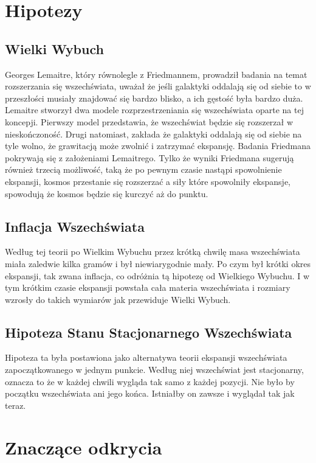 \documentclass[12pt]{article}
\begin{document}
	
	 
	\section{Hipotezy}
	\subsection{Wielki Wybuch}
	Georges Lemaitre, który równolegle z Friedmannem, prowadził badania na temat rozszerzania się wszechświata, uważał że jeśli galaktyki oddalają się od siebie to w przeszłości musiały znajdować się bardzo blisko, a ich gęstość była bardzo duża. Lemaitre stworzył dwa modele rozprzestrzeniania się wszechświata oparte na tej koncepji. Pierwszy model przedstawia, że wszechświat będzie się rozszerzał w nieskończoność. Drugi natomiast, zakłada że galaktyki oddalają się od siebie na tyle wolno, że grawitacją może zwolnić i zatrzymać ekspansję.
	Badania Friedmana pokrywają się z założeniami Lemaitrego.
	Tylko że wyniki Friedmana sugerują również trzecią możliwość, taką że  po pewnym czasie nastąpi spowolnienie ekspansji, kosmos przestanie się rozszerzać a siły które spowolniły ekspansje, spowodują że kosmos będzie się kurczyć aż do punktu.
	
	\subsection{Inflacja Wszechświata}
	Według tej teorii  po Wielkim Wybuchu przez krótką chwilę masa wszechświata miała zaledwie kilka gramów i był niewiarygodnie mały. Po czym był krótki okres ekspansji, tak zwana inflacja, co odróżnia tą hipotezę od Wielkiego Wybuchu. I w tym krótkim czasie ekspansji powstała cała materia wszechświata i rozmiary wzrosły do takich wymiarów jak przewiduje Wielki Wybuch.	
		
	\subsection{Hipoteza Stanu Stacjonarnego Wszechświata}
	Hipoteza ta była postawiona jako alternatywa teorii ekspansji wszechświata zapoczątkowanego w jednym punkcie. Według niej wszechświat jest stacjonarny, oznacza to że w każdej chwili wygląda tak samo z każdej pozycji. Nie było by początku wszechświata ani jego końca. Istniałby on zawsze i wyglądał tak jak teraz.
	
	\section{Znaczące odkrycia}
\end{document}
